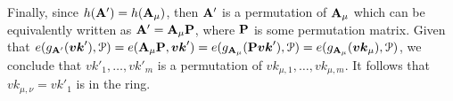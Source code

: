 Finally, since $h(\mathbf{{A}}')=h(\mathbf{{A}}_\mu)$, then $\mathbf{{A}}'$ is a permutation of $\mathbf{{A}}_\mu$ which can be equivalently written as $\mathbf{{A}}' = \mathbf{{A}}_\mu\mathbf{{P}}$, where $\mathbf{{P}}$ is some permutation matrix. Given that  $e(g_{\mathbf{{A}}'}({\boldsymbol{vk}}'),\mathcal{P})  = e(\mathbf{{A}}_\mu\mathbf{{P}},{\boldsymbol{vk}}')= e(g_{\mathbf{{A}}_\mu}(\mathbf{{P}}{\boldsymbol{vk}}'),\mathcal{P}) = e(g_{\mathbf{{A}}_{\mu}}({\boldsymbol{vk}}_\mu),\mathcal{P})$, we conclude that $vk'_1,\ldots,vk'_m$ is a permutation of $vk_{\mu,1},\ldots,vk_{\mu,m}$. It follows that $vk_{\mu,\nu}=vk'_1$ is in the ring.
